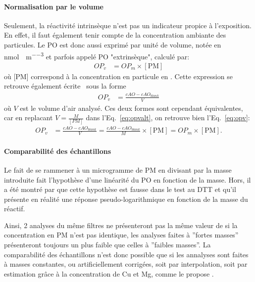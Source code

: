 \paragraph{Normalisation par le volume}%
\label{par:normalisation_par_le_volume}

Seulement, la réactivité intrinsèque n'est pas un indicateur propice à l'exposition. En
effet, il faut également tenir compte de la concentration ambiante des particules. Le PO
est donc aussi exprimé par unité de volume, notée \OPv{} en
\si{\nmol\per\min\per\cubic\meter} et parfois appelé PO "extrinsèque", calculé par:
\begin{align}
    \label{eq:opv}
    OP_v &= OP_m \times [\text{PM}]
\end{align}
où [PM] correspond à la concentration en particule en \si{\ugm}. Cette expression se
retrouve également écrite~\autocite{fangSemiautomated2015} sous la forme
\begin{align}
    \label{eq:opvalt}
    OP_v &= \frac{cAO - cAO_{blank}}{V}
\end{align}
où $V$ est le volume d'air analysé. Ces deux formes sont cependant équivalentes, car en
replacant $V = \frac{M}{[PM]}$ dans l'Eq.~\ref{eq:opvalt}, on retrouve bien
l'Eq.~\ref{eq:opv}:
\begin{align}
    \label{eq:opvopvalt}
    OP_v &= \frac{cAO -cAO_{blank}}{V} = \frac{cAO -cAO_{blank}}{M}\times [\text{PM}] = OP_m \times [\text{PM}].
\end{align}

\paragraph{Comparabilité des échantillons}%
\label{par:comparabilité_des_échantillons}

Le fait de se rammener à un microgramme de PM en divisant par la masse introduite fait
l'hypothèse d'une linéarité du PO en fonction de la masse. Hors, il a été montré par
\textcite{charrierDithiothreitol2012,charrierBias2016,calasComparison2018} que cette
hypothèse est fausse dans le test au DTT et qu'il présente en réalité une réponse
pseudo-logarithmique en fonction de la masse du réactif.

Ainsi, 2 analyses du même filtres ne présenteront pas la même valeur de \PODTTm{} si la
concentration en PM n'est pas identique, les analyses faites à ''fortes masses''
présenteront toujours un \PODTTm{} plus faible que celles à ''faibles masses''.
La comparabilité des échantillons n'est donc possible que si les annalyses sont faites à
masses constantes, ou artificiellement corrigées, soit par interpolation, soit par
estimation grâce à la concentration de Cu et Mg, comme le propose
\textcite{charrierBias2016}.


